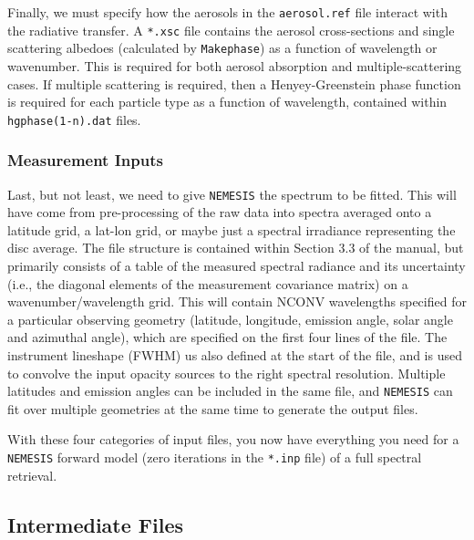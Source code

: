 \documentclass[final,5p,times,twocolumn,authoryear]{elsarticle}
\begin{document}
Finally, we must specify how the aerosols in the \verb#aerosol.ref# file interact with the radiative transfer.  A \verb#*.xsc# file contains the aerosol cross-sections and single scattering albedoes (calculated by \verb#Makephase#) as a function of wavelength or wavenumber.  This is required for both aerosol absorption and multiple-scattering cases.  If multiple scattering is required, then a Henyey-Greenstein phase function is required for each particle type as a function of wavelength, contained within \verb#hgphase(1-n).dat# files.

\subsubsection{Measurement Inputs}

Last, but not least, we need to give \verb#NEMESIS# the spectrum to be fitted.  This will have come from pre-processing of the raw data into spectra averaged onto a latitude grid, a lat-lon grid, or maybe just a spectral irradiance representing the disc average.  The file structure is contained within Section 3.3 of the manual, but primarily consists of a table of the measured spectral radiance and its uncertainty (i.e., the diagonal elements of the measurement covariance matrix) on a wavenumber/wavelength grid.  This will contain NCONV wavelengths specified for a particular observing geometry (latitude, longitude, emission angle, solar angle and azimuthal angle), which are specified on the first four lines of the file.  The instrument lineshape (FWHM) us also defined at the start of the file, and is used to convolve the input opacity sources to the right spectral resolution.  Multiple latitudes and emission angles can be included in the same file, and \verb#NEMESIS# can fit over multiple geometries at the same time to generate the output files.

With these four categories of input files, you now have everything you need for a \verb#NEMESIS# forward model (zero iterations in the \verb#*.inp# file) of a full spectral retrieval.  


\subsection{Intermediate Files}
\end{document}
